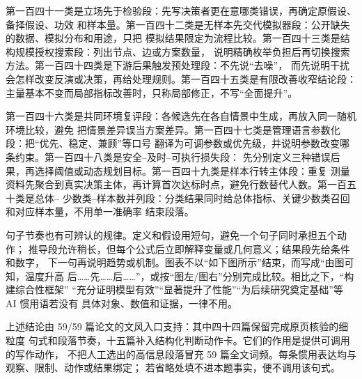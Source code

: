 第一百四十一类是立场先于检验段：先写决策者更在意哪类错误，再确定原假设、备择假设、功效
和样本量。第一百四十二类是无样本先交代模拟器段：公开缺失的数据、模拟分布和用途，只把
模拟结果限定为流程比较。第一百四十三类是结构规模授权搜索段：列出节点、边或方案数量，
说明精确枚举负担后再切换搜索方法。第一百四十四类是下游后果触发预处理段：不先说“去噪”，
而先说明干扰会怎样改变反演或决策，再给处理规则。第一百四十五类是有限改善收窄结论段：
主量基本不变而局部指标改善时，只称局部修正，不写“全面提升”。

第一百四十六类是共同环境复评段：各候选先在各自情景中生成，再放入同一随机环境比较，避免
把情景差异误当方案差异。第一百四十七类是管理语言参数化段：把“优先、稳定、兼顾”等口号
翻译为可调参数或优先级，并说明参数改变哪条约束。第一百四十八类是安全--及时--可执行损失段：
先分别定义三种错误后果，再选择阈值或动态规划目标。第一百四十九类是样本行转主体段：重复
测量资料先聚合到真实决策主体，再计算首次达标时点，避免行数替代人数。第一百五十类是总体--
少数类--样本数并列段：分类结果同时给总体指标、关键少数类召回和对应样本量，不用单一准确率
结束段落。

句子节奏也有可辨认的规律。定义和假设用短句，避免一个句子同时承担五个动作；
推导段允许稍长，但每个公式后立即解释变量或几何意义；结果段先给条件和数字，
下一句再说明趋势或机制。图表不以“如下图所示”结束，而写成“由图可知，温度升高
后……先……后……”，或按“图左/图右”分别完成比较。相比之下，“构建综合性框架”
“充分证明模型有效”“显著提升了性能”“为后续研究奠定基础”等 AI 惯用语若没有
具体对象、数值和证据，一律不用。

上述结论由 59/59 篇论文的文风入口支持：其中四十四篇保留完成原页核验的细粒度
句式和段落节奏，十五篇补入结构化判断动作卡。它们的作用是提供可调用的写作动作，
不把人工选出的高信息段落冒充 59 篇全文词频。每条惯用表达均与观察、限制、动作或结果绑定；
若省略处填不进本题事实，便不调用该句式。

